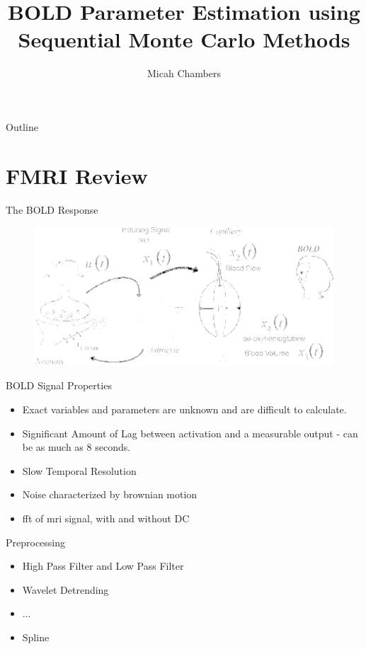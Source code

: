 \documentclass{beamer}
\title{BOLD Parameter Estimation using Sequential Monte Carlo Methods}
\author{Micah Chambers}
\institute {Virginia Tech Bioimaging Systems Lab}
\begin{document}
\begin{frame}
  \titlepage
\end{frame}

\begin{frame}{Outline}
  \tableofcontents
\end{frame}

\section{FMRI Review}
\begin{frame}{The BOLD Response}
\begin{figure}
\includegraphics[scale=.23]{model}
\caption{
    \tiny
    \cite{ISI:000189252300007}
}
\end{figure}
\end{frame}

\begin{frame}{BOLD Signal Properties}
  \begin{itemize}
    \item Exact variables and parameters are unknown and are
        difficult to calculate.
    \item Significant Amount of Lag between activation
        and a measurable output - can be as much as 8 seconds.
    \item Slow Temporal Resolution
    \item Noise characterized by brownian motion
    \item fft of mri signal, with and without DC
  \end{itemize}
\end{frame}

\begin{frame}{Preprocessing}
  \begin{itemize}
    \item High Pass Filter and Low Pass Filter
    \item Wavelet Detrending
    \item ...
    \item Spline
  \end{itemize}
\end{frame}
\end{document}
